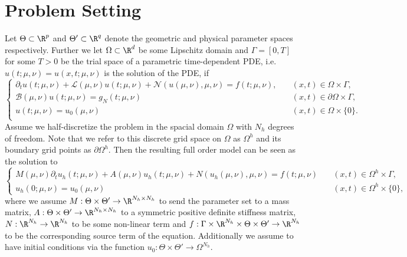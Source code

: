 \section{Problem Setting}

Let $\Theta \subset \R^{p}$ and $\Theta' \subset \R^q$ denote the geometric and physical parameter spaces respectively. Further we let $\Omega \subset \R^d$ be some Lipschitz domain and $\Gamma = [0, T]$ for some $T > 0$ be the trial space of a parametric time-dependent PDE, i.e. $u(t; \mu, \nu) = u(x, t; \mu, \nu)$ is the solution of the PDE, if
\begin{equation*}\begin{cases}
    \partial_t u(t; \mu, \nu) + \mathcal{L}(\mu, \nu)u(t; \mu, \nu) + \mathcal{N}(u(\mu, \nu), \mu, \nu) = f(t; \mu, \nu), \quad &(x, t) \in \Omega \times \Gamma, \\
    \mathcal{B}(\mu, \nu) u(t; \mu, \nu) = g_N(t; \mu, \nu) &(x, t) \in \partial \Omega \times \Gamma, \\
    u(t; \mu, \nu) = u_0(\mu, \nu) &(x, t) \in \Omega \times \{0 \}. \\
\end{cases}
\end{equation*}
Assume we half-discretize the problem in the spacial domain $\Omega$ with $N_h$ degrees of freedom. Note that we refer to this discrete grid space on $\Omega$ as $\Omega^h$ and its boundary grid points as $\partial \Omega^{h}$. Then the resulting full order model can be seen as the solution to 
\begin{equation*} \begin{cases}
    M(\mu, \nu) \partial_{t} u_h(t; \mu, \nu) + A(\mu, \nu) u_h(t; \mu, \nu) + N(u_h(\mu, \nu), \mu, \nu)= f(t; \mu, \nu)  \quad &(x, t) \in \Omega^{h} \times \Gamma, \\
    u_h(0; \mu, \nu) = u_0(\mu, \nu) \quad &(x, t) \in \Omega^{h} \times \{0\}, \end{cases} 
\end{equation*}
where we assume $M: \Theta \times \Theta' \to \R^{N_h \times N_h}$ to send the parameter set to a mass matrix, $A: \Theta \times \Theta' \to \R^{N_h \times N_h}$ to a symmetric positive definite stiffness matrix, $N: \R^{N_h} \to \R^{N_h}$ to be some non-linear term and $f: \Gamma \times \R^{N_h} \times \Theta \times \Theta' \to \R^{N_h}$ to be the corresponding source term of the equation. Additionally we assume to have initial conditions via the function $u_0: \Theta \times \Theta' \to \Omega^{N_h}$.

